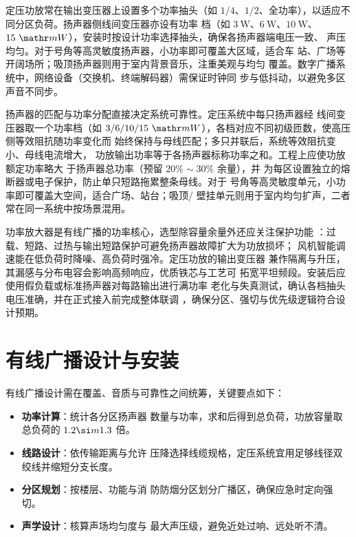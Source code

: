 定压功放常在输出变压器上设置多个功率抽头（如 $1/4$、$1/
2$、全功率），以适应不同分区负荷。扬声器侧线间变压器亦设有功率
档（如 $3\ \mathrm{W}$、$6\ \mathrm{
W}$、$10\ \mathrm{W}$、$15\ \mathr
m{W}$），安装时按设计功率选择抽头，确保各扬声器端电压一致、
声压均匀。对于号角等高灵敏度扬声器，小功率即可覆盖大区域，适合车
站、广场等开阔场所；吸顶扬声器则用于室内背景音乐，注重美观与均匀
覆盖。数字广播系统中，网络设备（交换机、终端解码器）需保证时钟同
步与低抖动，以避免多区声音不同步。

扬声器的匹配与功率分配直接决定系统可靠性。定压系统中每只扬声器经
线间变压器取一个功率档（如 $3/6/10/15\ \mathr
m{W}$），各档对应不同初级匝数，使高压侧等效阻抗随功率变化而
始终保持与母线匹配；多只并联后，系统等效阻抗变小、母线电流增大，
功放输出功率等于各扬声器标称功率之和。工程上应使功放额定功率略大
于扬声器总功率（预留 $20\%\sim 30\%$ 余量），并
为每区设置独立的熔断器或电子保护，防止单只短路拖累整条母线。对于
号角等高灵敏度单元，小功率即可覆盖大空间，适合广场、站台；吸顶/
壁挂单元则用于室内均匀扩声，二者常在同一系统中按场景混用。

功率放大器是有线广播的功率核心，选型除容量余量外还应关注保护功能
：过载、短路、过热与输出短路保护可避免扬声器故障扩大为功放损坏；
风机智能调速能在低负荷时降噪、高负荷时强冷。定压功放的输出变压器
兼作隔离与升压，其漏感与分布电容会影响高频响应，优质铁芯与工艺可
拓宽平坦频段。安装后应使用假负载或标准扬声器对每路输出进行满功率
老化与失真测试，确认各档抽头电压准确，并在正式接入前完成整体联调
，确保分区、强切与优先级逻辑符合设计预期。

\section{有线广播设计与安装}
\label{sec:wired_broadcast_design}

有线广播设计需在覆盖、音质与可靠性之间统筹，关键要点如下：

\begin{itemize}
    \item \textbf{功率计算}：统计各分区扬声器
数量与功率，求和后得到总负荷，功放容量取总负荷的 $1.2\si
m 1.3$ 倍。
    \item \textbf{线路设计}：依传输距离与允许
压降选择线缆规格，定压系统宜用足够线径双绞线并缩短分支长度。
    \item \textbf{分区规划}：按楼层、功能与消
防防烟分区划分广播区，确保应急时定向强切。
    \item \textbf{声学设计}：核算声场均匀度与
最大声压级，避免近处过响、远处听不清。
\end{itemize}


